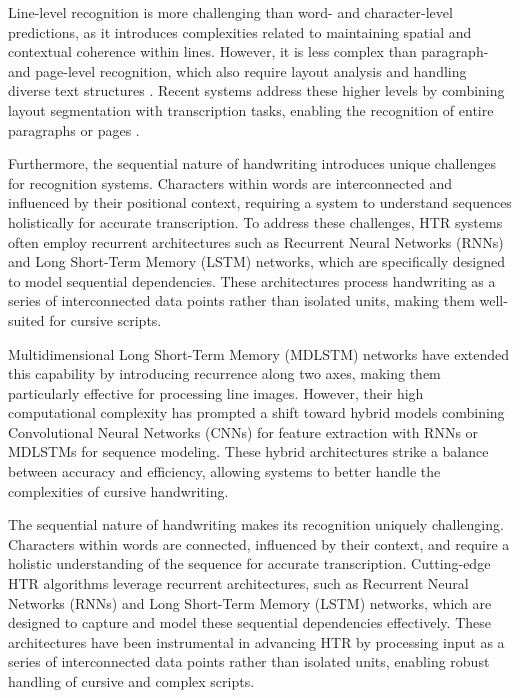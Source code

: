 \documentclass[conference]{IEEEtran}
\begin{document}
Line-level recognition is more challenging than word- and character-level predictions, as it introduces complexities related to maintaining spatial and contextual coherence within lines. However, it is less complex than paragraph- and page-level recognition, which also require layout analysis and handling diverse text structures \cite{clanuwat2019kuronet}. Recent systems address these higher levels by combining layout segmentation with transcription tasks, enabling the recognition of entire paragraphs \cite{such2018fully} or pages \cite{bhunia2019handwriting}.


Furthermore, the sequential nature of handwriting introduces unique challenges for recognition systems. Characters within words are interconnected and influenced by their positional context, requiring a system to understand sequences holistically for accurate transcription. To address these challenges, HTR systems often employ recurrent architectures such as Recurrent Neural Networks (RNNs) and Long Short-Term Memory (LSTM) networks, which are specifically designed to model sequential dependencies. These architectures process handwriting as a series of interconnected data points rather than isolated units, making them well-suited for cursive scripts.

Multidimensional Long Short-Term Memory (MDLSTM) networks have extended this capability by introducing recurrence along two axes, making them particularly effective for processing line images. However, their high computational complexity has prompted a shift toward hybrid models combining Convolutional Neural Networks (CNNs) for feature extraction with RNNs or MDLSTMs for sequence modeling. These hybrid architectures strike a balance between accuracy and efficiency, allowing systems to better handle the complexities of cursive handwriting.









The sequential nature of handwriting makes its recognition uniquely challenging. Characters within words are connected, influenced by their context, and require a holistic understanding of the sequence for accurate transcription. Cutting-edge HTR algorithms leverage recurrent architectures, such as Recurrent Neural Networks (RNNs) and Long Short-Term Memory (LSTM) networks, which are designed to capture and model these sequential dependencies effectively. These architectures have been instrumental in advancing HTR by processing input as a series of interconnected data points rather than isolated units, enabling robust handling of cursive and complex scripts.
\end{document}
